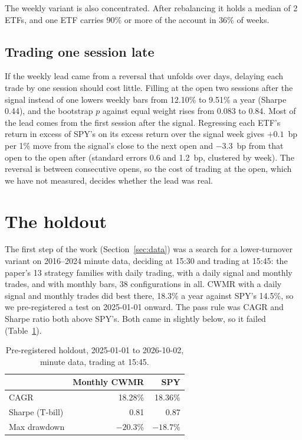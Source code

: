 \documentclass[11pt]{article}
\begin{document}
The weekly variant is also concentrated. After rebalancing it holds a median of 2 ETFs, and one
ETF carries 90\% or more of the account in 36\% of weeks. 

\subsection{Trading one session late}\label{sec:late}

If the weekly lead came from a reversal that unfolds over days, delaying each trade by one
session should cost little. Filling at the open two sessions after the signal instead of one
lowers weekly bars from 12.10\% to 9.51\% a year (Sharpe 0.44), and the bootstrap $p$ against
equal weight rises from 0.083 to 0.84. Most of the lead comes from the first session after the
signal. Regressing each ETF's return in excess of SPY's on its excess return over the signal
week gives $+0.1$~bp per 1\% move from the signal's close to the next open and $-3.3$~bp from
that open to the open after (standard errors 0.6 and 1.2~bp, clustered by week). The reversal is
between consecutive opens, so the cost of trading at the open, which we have not measured,
decides whether the lead was real.

\section{The holdout}\label{sec:holdout}

The first step of the work (Section~\ref{sec:data}) was a search for a lower-turnover variant
on 2016--2024 minute data,
deciding at 15:30 and trading at 15:45: the paper's 13 strategy families with daily trading,
with a daily signal and monthly trades, and with monthly bars, 38 configurations in all. CWMR
with a daily signal and monthly trades did best there, 18.3\% a year against SPY's 14.5\%, so we
pre-registered a test on 2025-01-01 onward. The pass rule was CAGR and Sharpe ratio both above
SPY's. Both came in slightly below, so it failed (Table~\ref{tab:holdout}).

\begin{table}[ht]
\centering
\caption{Pre-registered holdout, 2025-01-01 to 2026-10-02, minute data, trading at 15:45.}\label{tab:holdout}
\begin{tabular}{lrr}
\toprule
 & Monthly CWMR & SPY \\
\midrule
CAGR & 18.28\% & 18.36\% \\
Sharpe (T-bill) & 0.81 & 0.87 \\
Max drawdown & $-20.3$\% & $-18.7$\% \\
\bottomrule
\end{tabular}
\end{table}
\end{document}
